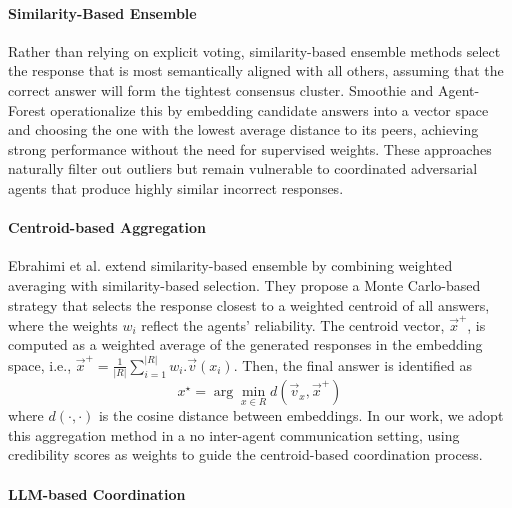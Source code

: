 \paragraph{Similarity-Based Ensemble}


Rather than relying on explicit voting, similarity-based ensemble methods select the response that is most semantically aligned with all others, assuming that the correct answer will form the tightest consensus cluster. Smoothie \cite{smoothie} and Agent-Forest \cite{more-agents} operationalize this by embedding candidate answers into a vector space and choosing the one with the lowest average distance to its peers, achieving strong performance without the need for supervised weights. These approaches naturally filter out outliers but remain vulnerable to coordinated adversarial agents that produce highly similar incorrect responses.

\paragraph{Centroid-based Aggregation} 
Ebrahimi et al. \cite{requal} extend similarity-based ensemble by combining weighted averaging with similarity-based selection. They propose a Monte Carlo-based strategy that selects the response closest to a weighted centroid of all answers, where the weights $w_i$ reflect the agents' reliability. 
The centroid vector, $\vec{x}^+$, is computed as a weighted average of the generated responses in the embedding space, i.e., $\vec{x}^+ = \frac{1}{|R|}\sum_{i=1}^{|R|} w_i.\vec{v}(x_i)$. Then, the final answer is identified as
\begin{equation}
x^{\star}=\arg\min_{x\in R} d(\vec{v}_x,\vec{x}^+)
\end{equation}
where $d(\cdot,\cdot)$ is the cosine distance between embeddings.
In our work, we adopt this aggregation method in a no inter-agent communication setting, using credibility scores as weights to guide the centroid-based coordination process.

\paragraph{LLM-based Coordination}

